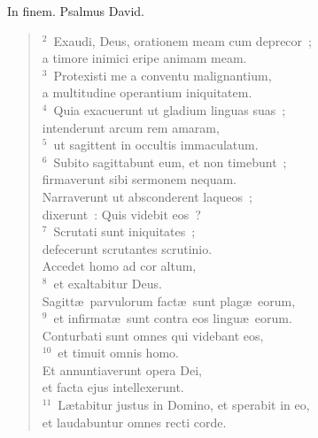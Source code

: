 \bchapter
\lettrine[lines=3,image=true,loversize=0.05,lraise=-0.03]{I}{}n finem. Psalmus David.
\begin{flushleft}\begin{verse}\vspace{6pt}${}^{2}$~Exaudi, Deus, orationem meam cum deprecor~;\\ a timore inimici eripe animam meam.\\
${}^{3}$~Protexisti me a conventu malignantium,\\ a multitudine operantium iniquitatem.\\
${}^{4}$~Quia exacuerunt ut gladium linguas suas~;\\ intenderunt arcum rem amaram,\\
${}^{5}$~ut sagittent in occultis immaculatum.\\
${}^{6}$~Subito sagittabunt eum, et non timebunt~;\\ firmaverunt sibi sermonem nequam.\\ Narraverunt ut absconderent laqueos~;\\ dixerunt~: Quis videbit eos~?\\
${}^{7}$~Scrutati sunt iniquitates~;\\ defecerunt scrutantes scrutinio.\\ Accedet homo ad cor altum,\\
${}^{8}$~et exaltabitur Deus.\\ Sagitt\ae\ parvulorum fact\ae\ sunt plag\ae\ eorum,\\
${}^{9}$~et infirmat\ae\ sunt contra eos lingu\ae\ eorum.\\ Conturbati sunt omnes qui videbant eos,\\
${}^{10}$~et timuit omnis homo.\\ Et annuntiaverunt opera Dei,\\ et facta ejus intellexerunt.\\
${}^{11}$~L\ae tabitur justus in Domino, et sperabit in eo,\\ et laudabuntur omnes recti corde.\end{verse}\end{flushleft}



